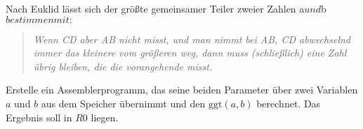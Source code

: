 \documentclass{bschlangaul-aufgabe}
\begin{document}

Nach Euklid lässt sich der größte gemeinsamer Teiler zweier Zahlen a$ und
$b$ bestimmen mit:
$
\begin{quote}
\itshape
Wenn CD aber AB nicht misst, und man nimmt bei AB, CD abwechselnd immer
das kleinere vom größeren weg, dann muss (schließlich) eine Zahl übrig
bleiben, die die vorangehende misst.
\end{quote}

\noindent
Erstelle ein Assemblerprogramm, das seine beiden Parameter über zwei
Variablen $a$ und $b$ aus dem Speicher übernimmt und
den $\text{ggt}(a, b)$ berechnet. Das Ergebnis soll in $R0$ liegen.

\begin{bAntwort}

\end{bAntwort}
\end{document}
